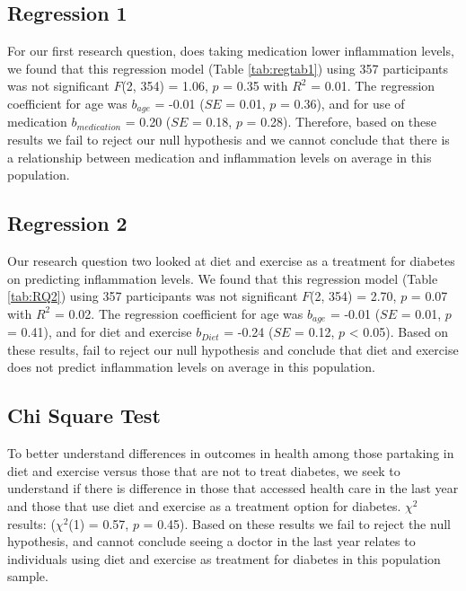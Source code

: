 \documentclass[
  man]{apa6}
\begin{document}
\hypertarget{regression-1}{%
\subsection{Regression 1}\label{regression-1}}

For our first research question, does taking medication lower inflammation levels, we found that this regression model (Table \ref{tab:regtab1}) using 357 participants was not significant \(F\)(2, 354) = 1.06, \(p\) = 0.35 with \(R^2\) = 0.01. The regression coefficient for age was \(b_{age}\) = -0.01 (\(SE\) = 0.01, \(p\) = 0.36), and for use of medication \(b_{medication}\) = 0.20 (\(SE\) = 0.18, \(p\) = 0.28). Therefore, based on these results we fail to reject our null hypothesis and we cannot conclude that there is a relationship between medication and inflammation levels on average in this population.

\hypertarget{regression-2}{%
\subsection{Regression 2}\label{regression-2}}

Our research question two looked at diet and exercise as a treatment for diabetes on predicting inflammation levels. We found that this regression model (Table \ref{tab:RQ2}) using 357 participants was not significant \(F\)(2, 354) = 2.70, \(p\) = 0.07 with \(R^2\) = 0.02. The regression coefficient for age was \(b_{age}\) = -0.01 (\(SE\) = 0.01, \(p\) = 0.41), and for diet and exercise \(b_{Diet}\) = -0.24 (\(SE\) = 0.12, \(p\) \textless{} 0.05). Based on these results, fail to reject our null hypothesis and conclude that diet and exercise does not predict inflammation levels on average in this population.

\hypertarget{chi-square-test}{%
\subsection{Chi Square Test}\label{chi-square-test}}

To better understand differences in outcomes in health among those partaking in diet and exercise versus those that are not to treat diabetes, we seek to understand if there is difference in those that accessed health care in the last year and those that use diet and exercise as a treatment option for diabetes. \(\chi^2\) results: (\(\chi^2\)(1) = 0.57, \(p\) = 0.45). Based on these results we fail to reject the null hypothesis, and cannot conclude seeing a doctor in the last year relates to individuals using diet and exercise as treatment for diabetes in this population sample.
\end{document}
